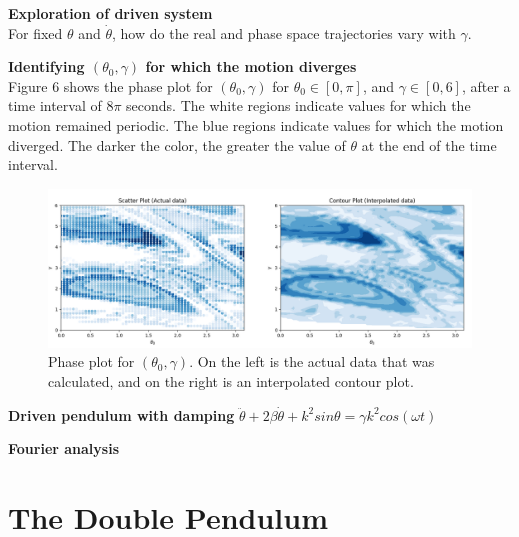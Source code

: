 \documentclass[12pt]{article}
\newenvironment{problem}[2][]{\begin{trivlist}
\item[\hskip \labelsep {\bfseries #1}\hskip \labelsep {\bfseries #2.}]}{\end{trivlist}}
\begin{document}
\begin{problem}{4}
	\textbf{Exploration of driven system} \\
	For fixed $\theta$ and $\dot{\theta}$, how do the real and phase space trajectories vary with $\gamma$.  

	\begin{figure}[ht!]
	\centering
	\begin{minipage}[b]{0.4\textwidth}
		\label{}
	\end{minipage}
	\hfill
	\begin{minipage}[b]{0.4\textwidth}
		\label{}
	\end{minipage}
	\caption{}
\end{figure}
\end{problem}

\begin{problem}{5}
	\textbf{Identifying $(\theta_{0},\gamma)$ for which the motion diverges} \\

	Figure 6 shows the phase plot for $(\theta_{0},\gamma)$ for $\theta_{0} \in [0,\pi]$, and $\gamma \in [0,6]$, after a time interval of $8\pi$ seconds.  The white regions indicate values for which the motion remained periodic. The blue regions indicate values for which the motion diverged.  The darker the color, the greater the value of $\theta$ at the end of the time interval.
\begin{figure}[h!]
	\centering
  	\includegraphics[scale=0.5]{../figures/diverge2.png}
 	\caption{Phase plot for $(\theta_{0},\gamma)$. On the left is the actual data that was calculated, and on the right is an interpolated contour plot.}
  	\label{diverge}
\end{figure}
\end{problem}

\begin{problem}{6}
	\textbf{Driven pendulum with damping} $\ddot{\theta}+2\beta\dot{\theta}+k^{2}sin\theta=\gamma k^{2}cos(\omega t)$ \\


\end{problem}

\begin{problem}{7}
	\textbf{Fourier analysis}
\end{problem}

\section*{The Double Pendulum}
\end{document}
